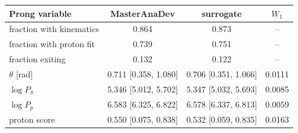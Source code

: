 \begin{tabular}{lccc}
\toprule
Prong variable & MasterAnaDev & surrogate & $W_1$ \\
\midrule
fraction with kinematics & 0.864 & 0.873 & -- \\
fraction with proton fit & 0.739 & 0.751 & -- \\
fraction exiting & 0.132 & 0.122 & -- \\
$\theta$ [rad] & 0.711 [0.358, 1.080] & 0.706 [0.351, 1.066] & 0.0111 \\
$\log P_\pi$ & 5.346 [5.012, 5.702] & 5.347 [5.032, 5.693] & 0.0085 \\
$\log P_p$ & 6.583 [6.325, 6.822] & 6.578 [6.337, 6.813] & 0.0059 \\
proton score & 0.550 [0.075, 0.838] & 0.532 [0.059, 0.835] & 0.0163 \\
\bottomrule
\end{tabular}
